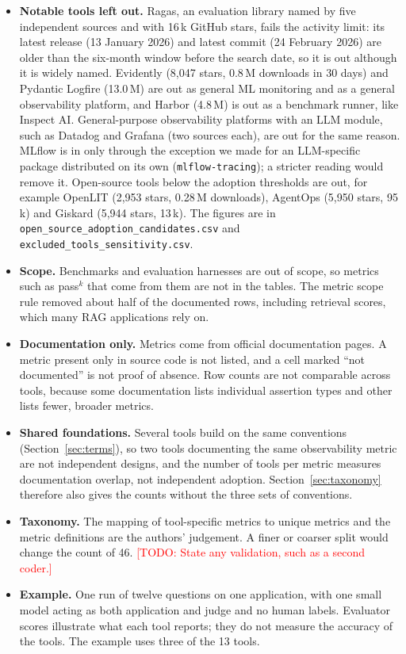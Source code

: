 \documentclass[conference]{IEEEtran}
\newcommand{\todo}[1]{\textcolor{red}{[TODO: #1]}}
\begin{document}
\begin{itemize}
  \item \textbf{Notable tools left out.} Ragas, an evaluation library named by five independent sources and with 16\,k GitHub stars, fails the activity limit: its latest release (13 January 2026) and latest commit (24 February 2026) are older than the six-month window before the search date, so it is out although it is widely named. Evidently (8,047 stars, 0.8\,M downloads in 30 days) and Pydantic Logfire (13.0\,M) are out as general ML monitoring and as a general observability platform, and Harbor (4.8\,M) is out as a benchmark runner, like Inspect AI. General-purpose observability platforms with an LLM module, such as Datadog and Grafana (two sources each), are out for the same reason. MLflow is in only through the exception we made for an LLM-specific package distributed on its own (\texttt{mlflow-tracing}); a stricter reading would remove it. Open-source tools below the adoption thresholds are out, for example OpenLIT (2,953 stars, 0.28\,M downloads), AgentOps (5,950 stars, 95\,k) and Giskard (5,944 stars, 13\,k). The figures are in \texttt{open\_source\_adoption\_candidates.csv} and \texttt{excluded\_tools\_sensitivity.csv}.
  \item \textbf{Scope.} Benchmarks and evaluation harnesses are out of scope, so metrics such as pass$^k$ that come from them are not in the tables. The metric scope rule removed about half of the documented rows, including retrieval scores, which many RAG applications rely on.
  \item \textbf{Documentation only.} Metrics come from official documentation pages. A metric present only in source code is not listed, and a cell marked ``not documented'' is not proof of absence. Row counts are not comparable across tools, because some documentation lists individual assertion types and other lists fewer, broader metrics.
  \item \textbf{Shared foundations.} Several tools build on the same conventions (Section~\ref{sec:terms}), so two tools documenting the same observability metric are not independent designs, and the number of tools per metric measures documentation overlap, not independent adoption. Section~\ref{sec:taxonomy} therefore also gives the counts without the three sets of conventions.
  \item \textbf{Taxonomy.} The mapping of tool-specific metrics to unique metrics and the metric definitions are the authors' judgement. A finer or coarser split would change the count of 46. \todo{State any validation, such as a second coder.}
  \item \textbf{Example.} One run of twelve questions on one application, with one small model acting as both application and judge and no human labels. Evaluator scores illustrate what each tool reports; they do not measure the accuracy of the tools. The example uses three of the 13 tools.
\end{itemize}
\end{document}
